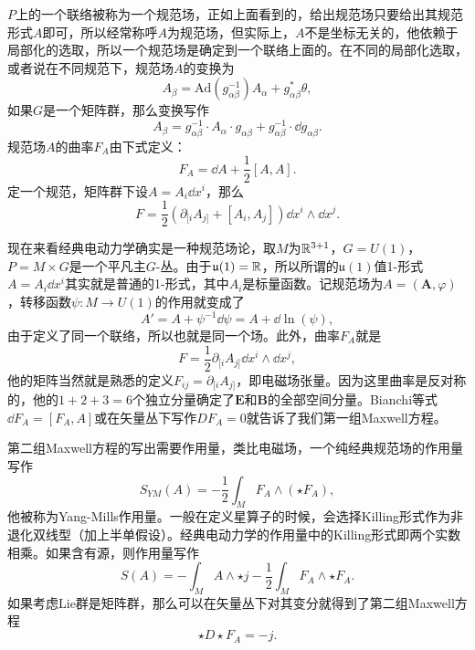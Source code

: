 $P$上的一个联络被称为一个规范场，正如上面看到的，给出规范场只要给出其规范形式$A$即可，所以经常称呼$A$为规范场，但实际上，$A$不是坐标无关的，他依赖于局部化的选取，所以一个规范场是确定到一个联络上面的。在不同的局部化选取，或者说在不同规范下，规范场$A$的变换为
\[
	A_\beta=\mathrm{Ad}(g_{\alpha\beta}^{-1})A_\alpha+g_{\alpha\beta}^*\theta,
\]
如果$G$是一个矩阵群，那么变换写作
\[
	A_\beta=g_{\alpha\beta}^{-1}\cdot A_\alpha \cdot g_{\alpha\beta}+g_{\alpha\beta}^{-1}\cdot \dd g_{\alpha\beta}.
\]
规范场$A$的曲率$F_A$由下式定义：
\[
	F_A=\dd A+\frac{1}{2}[A,A].
\]
定一个规范，矩阵群下设$A=A_i\dd x^i$，那么
\[
	F=\frac{1}{2}\left(\partial_{[i}A_{j]}+[A_i,A_j]\right)\dd x^i\wedge \dd x^j.
\]

现在来看经典电动力学确实是一种规范场论，取$M$为$\mathbb{R}^{3+1}$，$G=U(1)$，$P=M\times G$是一个平凡主$G$-丛。由于$\mathfrak{u}(1)=\mathbb{R}$，所以所谓的$\mathfrak{u}(1)$值1-形式$A=A_i\dd x^i$其实就是普通的1-形式，其中$A_i$是标量函数。记规范场为$A=(\bm{A},\varphi)$，转移函数$\psi:M\to U(1)$的作用就变成了
\[
	A'=A+\psi^{-1} \dd \psi=A+\dd \ln(\psi),
\]
由于定义了同一个联络，所以也就是同一个场。此外，曲率$F_A$就是
\[
	F=\frac{1}{2}\partial_{[i}A_{j]}\dd x^i\wedge \dd x^j,
\]
他的矩阵当然就是熟悉的定义$F_{ij}=\partial_{[i}A_{j]}$，即电磁场张量。因为这里曲率是反对称的，他的$1+2+3=6$个独立分量确定了$\bm{E}$和$\bm{B}$的全部空间分量。Bianchi等式$\dd F_A=[F_A,A]$或在矢量丛下写作$DF_A=0$就告诉了我们第一组Maxwell方程。

第二组Maxwell方程的写出需要作用量，类比电磁场，一个纯经典规范场的作用量写作
\[
	S_{YM}(A)=-\frac{1}{2}\int_M F_A\wedge(\star F_A),
\]
他被称为Yang-Mills作用量。一般在定义星算子的时候，会选择Killing形式作为非退化双线型（加上半单假设）。经典电动力学的作用量中的Killing形式即两个实数相乘。如果含有源，则作用量写作
\[
	S(A)=-\int_M A\wedge\star j-\frac{1}{2}\int_M F_A\wedge\star F_A.
\]
如果考虑Lie群是矩阵群，那么可以在矢量丛下对其变分就得到了第二组Maxwell方程
\[
	\star D\star F_A=-j.
\]
